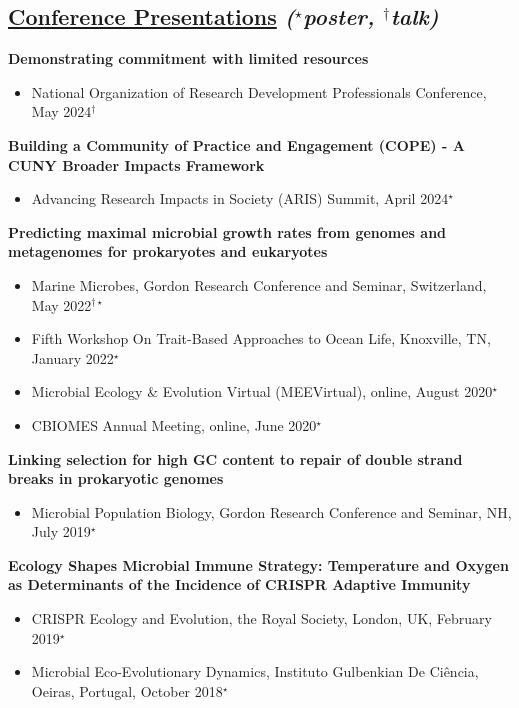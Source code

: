 \documentclass[]{res}
\begin{document}
\begin{resume}
 \section{\underline{Conference Presentations} \emph{{($^{\star}$poster, $^{\dagger}$talk)}}} \vspace{2mm}
 
 {\bf Demonstrating commitment with limited resources}
 \begin{itemize}
 \item National Organization of Research Development Professionals Conference, May 2024$^{\dagger}$
 \end{itemize} 
 
 {\bf Building a Community of Practice and Engagement (COPE) - A CUNY Broader Impacts Framework}
 \begin{itemize}
 \item Advancing Research Impacts in Society (ARIS) Summit, April 2024$^{\star}$
 \end{itemize}
 
 {\bf Predicting maximal microbial growth rates from genomes and metagenomes for prokaryotes and eukaryotes}
 \begin{itemize}
 \item Marine Microbes, Gordon Research Conference and Seminar, Switzerland, May 2022$^{\dagger\star}$
 \item Fifth Workshop On Trait-Based Approaches to Ocean Life, Knoxville, TN, January 2022$^{\star}$
 \item Microbial Ecology \& Evolution Virtual (MEEVirtual), online, August 2020$^{\star}$
 \item CBIOMES Annual Meeting, online, June 2020$^{\star}$
 \end{itemize}
 
{\bf Linking selection for high GC content to repair of double strand breaks in prokaryotic genomes}
 \begin{itemize}
 \item Microbial Population Biology, Gordon Research Conference and Seminar, NH, July 2019$^{\star}$
 \end{itemize} 
 
{\bf Ecology Shapes Microbial Immune Strategy: Temperature and Oxygen as Determinants of the Incidence of CRISPR Adaptive Immunity} 
 \begin{itemize}
 \item CRISPR Ecology and Evolution, the Royal Society, London, UK, February 2019$^{\star}$
 \item Microbial Eco-Evolutionary Dynamics, Instituto Gulbenkian De Ci\^{e}ncia, Oeiras, Portugal, October 2018$^{\star}$
 \end{itemize}
 

\end{resume}
\end{document}
